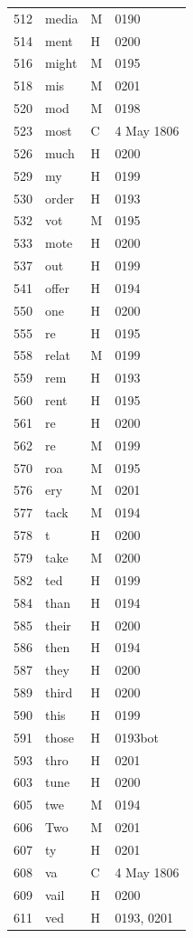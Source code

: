 \begin{longtable}{@{}rlll@{}}
512 & media & M & 0190 \\
514 & ment & H & 0200 \\
516 & might & M & 0195 \\
518 & mis & M & 0201 \\
520 & mod & M & 0198 \\
523 & most & C & 4 May 1806 \\
526 & much & H & 0200 \\
529 & my & H & 0199 \\
530 & order & H & 0193 \\
532 & vot & M & 0195 \\
533 & mote & H & 0200 \\
537 & out & H & 0199 \\
541 & offer & H & 0194 \\
550 & one & H & 0200 \\
555 & re & H & 0195 \\
558 & relat & M & 0199 \\
559 & rem & H & 0193 \\
560 & rent & H & 0195 \\
561 & re & H & 0200 \\
562 & re & M & 0199 \\
570 & roa & M & 0195 \\
576 & ery & M & 0201 \\
577 & tack & M & 0194 \\
578 & t & H & 0200 \\
579 & take & M & 0200 \\
582 & ted & H & 0199 \\
584 & than & H & 0194 \\
585 & their & H & 0200 \\
586 & then & H & 0194 \\
587 & they & H & 0200 \\
589 & third & H & 0200 \\
590 & this & H & 0199 \\
591 & those & H & 0193bot \\
593 & thro & H & 0201 \\
603 & tune & H & 0200 \\
605 & twe & M & 0194 \\
606 & Two & M & 0201 \\
607 & ty & H & 0201 \\
608 & va & C & 4 May 1806 \\
609 & vail & H & 0200 \\
611 & ved & H & 0193, 0201 \\

\end{longtable}
